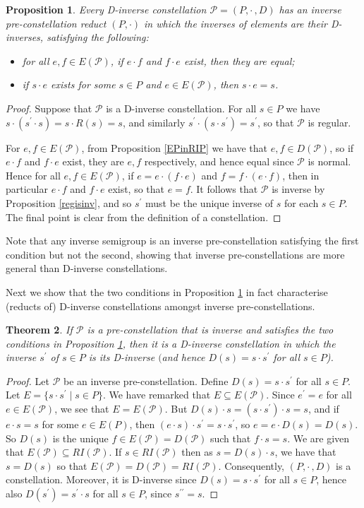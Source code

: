 \documentclass[12pt]{amsart}
\newtheorem{thm}{Theorem}[section]
\newtheorem{pro}[thm]{Proposition}
\theoremstyle{definition}
\newcommand{\bi}{\begin{itemize}}
\newcommand{\ei}{\end{itemize}}
\newcommand{\Pcon}{\mathcal P}
\begin{document}
\begin{pro}  \label{cond12}
Every D-inverse constellation $\Pcon=(P,\cdot\, ,D)$ has an inverse pre-constellation reduct $(P,\cdot)$ in which the inverses of elements are their D-inverses, satisfying the following:
\bi
\item for all $e,f\in E(\Pcon)$, if $e\cdot f$ and $f\cdot e$ exist, then they are equal;
\item if $s\cdot e$ exists for some $s\in P$ and $e\in E(\Pcon)$, then $s\cdot e=s$.
\ei
\end{pro}
\begin{proof}
Suppose that $\Pcon$ is a D-inverse constellation.  For all $s\in P$ we have  $s\cdot (s^{\prime}\cdot s)=s\cdot R(s)=s$, and similarly $s^{\prime}\cdot(s\cdot s^{\prime})=s^{\prime}$, so that $\Pcon$  is regular.

For $e,f\in E(\Pcon)$, from Proposition \ref{EPinRIP} we have that $e,f\in D(\Pcon)$, so if $e\cdot f$ and $f\cdot e$ exist, they are $e,f$ respectively, and hence equal since $\Pcon$ is normal.   Hence for all $e,f\in E(\Pcon)$, if $e=e\cdot (f\cdot e)$ and $f=f\cdot (e\cdot f)$, then in particular $e\cdot f$ and $f\cdot e$ exist, so that $e=f$.  It follows that $\Pcon$ is inverse by Proposition \ref{regisinv}, and so $s^{\prime}$ must be the unique inverse of $s$ for each $s\in P$.  The final point is clear from the definition of a constellation.
\end{proof}

Note that any inverse semigroup is an inverse pre-constellation satisfying the first condition but not the second,  showing that inverse pre-constellations are  more general than D-inverse constellations.
  
Next we show that the two conditions in Proposition \ref{cond12} in fact characterise (reducts of) D-inverse constellations amongst inverse pre-constellations.

\begin{thm}
If $\Pcon$ is a pre-constellation that is inverse and satisfies the two conditions in Proposition \ref{cond12}, then it is a D-inverse  constellation in which the inverse $s^{\prime}$ of $s\in P$ is its D-inverse $($and hence $D(s)=s\cdot s^{\prime}$ for all $s\in P$).
\end{thm}
\begin{proof}
Let $\Pcon$ be an inverse pre-constellation.  Define $D(s)=s\cdot s^{\prime}$ for all $s\in P$.  Let $E=\{s\cdot s^{\prime}\mid s\in P\}$.  We have remarked that $E\subseteq E(\Pcon)$.   Since $e^{\prime}=e$ for all $e\in E(\Pcon)$, we see that $E=E(\Pcon)$.  But $D(s)\cdot s=(s\cdot s^{\prime})\cdot s=s$, and if $e\cdot s=s$ for some $e\in E(P)$, then $(e\cdot s)\cdot s^{\prime}=s\cdot s^{\prime}$, so $e=e\cdot D(s)=D(s)$.  So $D(s)$ is the unique $f\in E(\Pcon)=D(\Pcon)$ such that $f\cdot s=s$. We are given that $E(\Pcon)\subseteq RI(\Pcon)$. If $s\in RI(\Pcon)$ then as $s=D(s)\cdot s$, we have that $s=D(s)$ so that $E(\Pcon)=D(\Pcon)=RI(\Pcon)$. Consequently,  $(P,\cdot\, ,D)$ is a constellation. Moreover, it is D-inverse since  $D(s)=s\cdot s^{\prime}$ for all $s\in P$, hence also $D(s^{\prime})=s^{\prime}\cdot s$ for all $s\in P$, since $s^{\prime\prime}=s$.
\end{proof}
\end{document}
